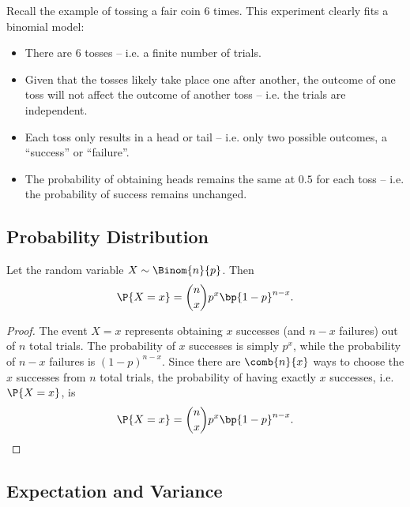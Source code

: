 \begin{example}
    Recall the example of tossing a fair coin 6 times. This experiment clearly fits a binomial model:
    \begin{itemize}
        \item There are 6 tosses -- i.e. a finite number of trials.
        \item Given that the tosses likely take place one after another, the outcome of one toss will not affect the outcome of another toss -- i.e. the trials are independent.
        \item Each toss only results in a head or tail -- i.e. only two possible outcomes, a ``success'' or ``failure''.
        \item The probability of obtaining heads remains the same at $0.5$ for each toss -- i.e. the probability of success remains unchanged.
    \end{itemize}
\end{example}

\subsection{Probability Distribution}

\begin{proposition}
    Let the random variable $X \sim \Binom{n}{p}$. Then \[\P{X = x} = \binom{n}{x} p^x \bp{1 - p}^{n-x}.\]
\end{proposition}
\begin{proof}
    The event $X = x$ represents obtaining $x$ successes (and $n-x$ failures) out of $n$ total trials. The probability of $x$ successes is simply $p^x$, while the probability of $n-x$ failures is $(1-p)^{n-x}$. Since there are $\comb{n}{x}$ ways to choose the $x$ successes from $n$ total trials, the probability of having exactly $x$ successes, i.e. $\P{X = x}$, is \[\P{X = x} = \binom{n}{x} p^x \bp{1 - p}^{n-x}.\]
\end{proof}

\subsection{Expectation and Variance}

